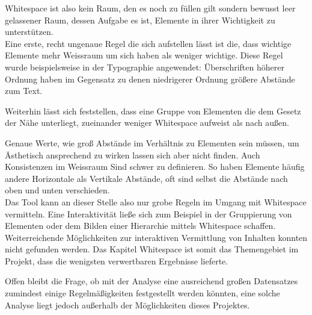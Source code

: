 Whitespace ist also kein Raum, den es noch zu füllen gilt sondern bewusst leer gelassener Raum, dessen Aufgabe es ist, Elemente in ihrer Wichtigkeit zu unterstützen. \\
Eine erste, recht ungenaue Regel die sich aufstellen lässt ist die, dass wichtige Elemente mehr Weissraum um sich haben als weniger wichtige. Diese Regel wurde beispielsweise in der Typographie angewendet: Überschriften höherer Ordnung haben im Gegensatz zu denen niedrigerer Ordnung größere Abstände zum Text.

Weiterhin lässt sich feststellen, dass eine Gruppe von Elementen die dem Gesetz der Nähe \cite{mayer2005einfuhrung} unterliegt, zueinander weniger Whitespace aufweist als nach außen.

Genaue Werte, wie groß Abstände im Verhältnis zu Elementen sein müssen, um Ästhetisch ansprechend zu wirken lassen sich aber nicht finden. Auch Konsistenzen im Weissraum Sind schwer zu definieren. So haben Elemente häufig andere Horizontale als Vertikale Abstände, oft sind selbst die Abstände nach oben und unten verschieden. \\
Das Tool kann an dieser Stelle also nur grobe Regeln im Umgang mit Whitespace vermitteln. Eine Interaktivität ließe sich zum Beispiel in der Gruppierung von Elementen oder dem Bilden einer Hierarchie mittels Whitespace schaffen. Weiterreichende Möglichkeiten zur interaktiven Vermittlung von Inhalten konnten nicht gefunden werden. Das Kapitel Whitespace ist somit das Themengebiet im Projekt, dass die wenigsten verwertbaren Ergebnisse lieferte.

Offen bleibt die Frage, ob mit der Analyse eine ausreichend großen Datensatzes zumindest einige Regelmäßigkeiten festgestellt werden könnten, eine solche Analyse liegt jedoch außerhalb der Möglichkeiten dieses Projektes.

\clearpage
